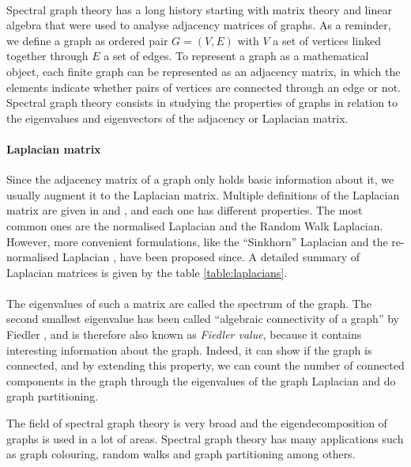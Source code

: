 \paragraph{}
Spectral graph theory has a long history starting with matrix theory and linear algebra that were used to analyse adjacency matrices of graphs.
As a reminder, we define a graph as ordered pair \(G = (V, E)\) with \(V\) a set of vertices linked together through \(E\) a set of edges.
To represent a graph as a mathematical object, each finite graph can be represented as an adjacency matrix, in which the elements indicate whether pairs of vertices are connected through an edge or not.
Spectral graph theory consists in studying the properties of graphs in relation to the eigenvalues and eigenvectors of the adjacency or Laplacian matrix.

\paragraph{Laplacian matrix}
Since the adjacency matrix of a graph only holds basic information about it, we usually augment it to the Laplacian matrix.
Multiple definitions of the Laplacian matrix are given in \cite{chung_spectral_1997} and \cite{siam_slides_2016}, and each one has different properties.
The most common ones are the normalised Laplacian and the Random Walk Laplacian.
However, more convenient formulations, like the ``Sinkhorn'' Laplacian \cite{milanfar_symmetrizing_2013} and the re-normalised Laplacian \cite{milanfar_new_2016}, have been proposed since.
A detailed summary of Laplacian matrices is given by the table \ref{table:laplacians}.

\paragraph{}
The eigenvalues of such a matrix are called the spectrum of the graph.
The second smallest eigenvalue has been called ``algebraic connectivity of a graph'' by Fiedler \cite{fiedler_algebraic_1973}, and is therefore also known as \textit{Fiedler value}, because it contains interesting information about the graph.
Indeed, it can show if the graph is connected, and by extending this property, we can count the number of connected components in the graph through the eigenvalues of the graph Laplacian and do graph partitioning.

The field of spectral graph theory is very broad and the eigendecomposition of graphs is used in a lot of areas.
Spectral graph theory has many applications such as graph colouring, random walks and graph partitioning among others.

